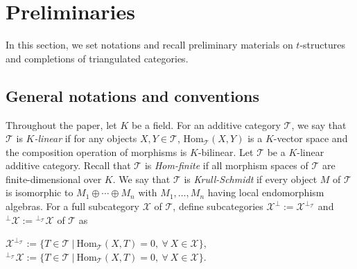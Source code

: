 \documentclass[11pt,a4paper]{amsart}
\numberwithin{equation}{section} \theoremstyle{plain}
\numberwithin{equation}{section} \theoremstyle{definition}
\begin{document}
\section{\bf Preliminaries}
In this section, we set notations and recall preliminary materials on $t$-structures and completions of triangulated categories.

\subsection{General notations and conventions}
\noindent

Throughout the paper, let $K$ be a field. For an additive category $\mathcal{T}$, we say that $\mathcal{T}$ is \emph{$K$-linear} if for any objects $X,Y\in\mathcal{T}$, $\mathrm{Hom}_{\mathcal{T}}(X,Y)$ is a $K$-vector space and the composition operation of morphisms is $K$-bilinear. Let $\mathcal{T}$ be a $K$-linear additive category. Recall that $\mathcal{T}$ is \emph{Hom-finite} if all morphism spaces of $\mathcal{T}$ are finite-dimensional over $K$. We say that $\mathcal{T}$ is \emph{Krull-Schmidt} if every object $M$ of $\mathcal{T}$ is isomorphic to $ M_{1}\oplus \cdots\oplus M_{n}$ with $M_{1}, \ldots, M_{n}$ having local endomorphism algebras. For a full subcategory $\mathcal{X}$ of $\mathcal{T}$, define subcategories $\mathcal{X}^{\perp}:=\mathcal{X}^{\perp_{\mathcal{T}}}$ and ${^{\perp}\mathcal{X}}:={^{\perp_{\mathcal{T}}}\mathcal{X}}$ of $\mathcal{T}$ as
\begin{center}
$\mathcal{X}^{\perp_{\mathcal{T}}}:=\{T\in\mathcal{T}~|~\mathrm{Hom}_{\mathcal{T}}(X,T)=0,~\forall~X\in\mathcal{X}\}$,\\
${^{\perp_{\mathcal{T}}}\mathcal{X}}:=\{T\in\mathcal{T}~|~\mathrm{Hom}_{\mathcal{T}}(X,T)=0,~\forall~X\in\mathcal{X}\}$.
\end{center}
\end{document}
